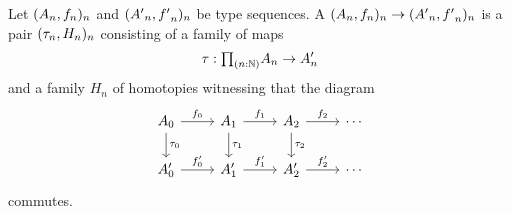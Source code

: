 \begin{comment}
\begin{defn}
A \define{global section} $\sequence{t}{T}$ of a sequence $\sequence{P}{f}$ over
$\sequence{A}{a}$ consists of 
\begin{align*}
t & : \prd{n:\nat}{x:A_n}P_n(x) \\
T & : \prd{n:\nat}{x:A_n}\id{t_{n+1}(a_n(x))}{f_n(t_n(x))}
\end{align*}
\end{defn}

For the following definition, recall that for any two types $X$ and $Y$, we
may consider the constant type family $\ctxwk{X}{Y}\defeq\lam{x}Y:X\to\type$.
This process is called weakening.

\begin{defn}
Let $\sequence{A}{a}$ and $\sequence{B}{b}$ be sequences of types. Then we
define the \define{weakened sequence} $\ctxwk{\sequence{A}{a}}{\sequence{B}{b}}$ over
$\sequence{A}{a}$ to consist of
\begin{equation*}
\begin{tikzcd}[column sep=large]
\ctxwk{A_0}{B_0} \arrow[r,"\lam{x} b_0"] \arrow[d,->>] & \ctxwk{A_1}{B_1} \arrow[r,"\lam{x}b_1"] \arrow[d,->>] & \ctxwk{A_2}{B_2} \arrow[r,"\lam{x}b_2"] \arrow[d,->>] & \cdots \\
A_0 \arrow[r,"a_0"] & A_1 \arrow[r,"a_1"] & A_2 \arrow[r,"a_2"] & \cdots
\end{tikzcd}
\end{equation*}
\end{defn}
\end{comment}

\begin{defn}
Let $({A}_{n},{f}_{n})_{n}$ and $({A'}_{n},{f'}_{n})_{n}$ be type sequences.
A  $({A}_{n},{f}_{n})_{n}\to({A'}_{n},{f'}_{n})_{n}$
is a pair $({\tau}_{n},{H}_{n})_{n}$ consisting of a family of maps
\begin{equation*}
\tau : \prd{n:\N} A_n \to A'_n
\end{equation*}
and a family $H_n$ of homotopies witnessing that the diagram
\begin{equation*}
\begin{tikzcd}
A_{0} \arrow[r,"f_0"] \arrow[d,"\tau_0"] & A_{1} \arrow[r,"f_1"] \arrow[d,"\tau_1"] & A_{2} \arrow[r,"f_2"] \arrow[d,"\tau_2"] & \cdots \\
A'_0 \arrow[r,"{f'_0}"] & A'_1 \arrow[r,"{f'_1}"] & A'_2 \arrow[r,"{f'_2}"] & \cdots
\end{tikzcd}
\end{equation*}
commutes.
\end{defn}

